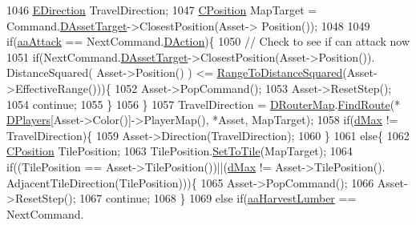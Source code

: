 \begin{DoxyCode}
{{1046                 \hyperlink{GameDataTypes_8h_acb2b033915f6659a71a38b5aa6e4eb42}{EDirection} TravelDirection;
1047                 \hyperlink{classCPosition}{CPosition} MapTarget = Command.\hyperlink{structSAssetCommand_a3d9b43f6e59c386c48c41a65448a0c39}{DAssetTarget}->ClosestPosition(Asset->
      Position());
1048                 
1049                 \textcolor{keywordflow}{if}(\hyperlink{GameDataTypes_8h_ab47668e651a3032cfb9c40ea2d60d670a948eefd20b9e43d3b4cfcf613774716d}{aaAttack} == NextCommand.\hyperlink{structSAssetCommand_a8edd3b3d59a76d5514ba403bc8076a75}{DAction})\{
1050                     \textcolor{comment}{// Check to see if can attack now}
1051                     \textcolor{keywordflow}{if}(NextCommand.\hyperlink{structSAssetCommand_a3d9b43f6e59c386c48c41a65448a0c39}{DAssetTarget}->ClosestPosition(Asset->Position()).
      DistanceSquared( Asset->Position() ) <= \hyperlink{GameModel_8cpp_afd5c111a1369dc53d1b1230506e99f7c}{RangeToDistanceSquared}(Asset->EffectiveRange()))\{
1052                         Asset->PopCommand();
1053                         Asset->ResetStep();
1054                         \textcolor{keywordflow}{continue};   
1055                     \}
1056                 \}
1057                 TravelDirection = \hyperlink{classCGameModel_a37d0b5536c88a3e6ec16f46e7a413adf}{DRouterMap}.\hyperlink{classCRouterMap_ac638dca74d6ebe3602db9f7c69881146}{FindRoute}(*
      \hyperlink{classCGameModel_a524436c3560b10e1c6d6fdd0b66565dc}{DPlayers}[Asset->Color()]->PlayerMap(), *Asset, MapTarget);
1058                 \textcolor{keywordflow}{if}(\hyperlink{GameDataTypes_8h_acb2b033915f6659a71a38b5aa6e4eb42af6546049275557ce0ade2ceee042a319}{dMax} != TravelDirection)\{
1059                     Asset->Direction(TravelDirection);
1060                 \}
1061                 \textcolor{keywordflow}{else}\{
1062                     \hyperlink{classCPosition}{CPosition} TilePosition;
1063                     TilePosition.\hyperlink{classCPosition_ae302aa21792de64c97de29e2cbbfeb94}{SetToTile}(MapTarget);
1064                     \textcolor{keywordflow}{if}((TilePosition == Asset->TilePosition())||(\hyperlink{GameDataTypes_8h_acb2b033915f6659a71a38b5aa6e4eb42af6546049275557ce0ade2ceee042a319}{dMax} != Asset->TilePosition().
      AdjacentTileDirection(TilePosition)))\{
1065                         Asset->PopCommand();
1066                         Asset->ResetStep();
1067                         \textcolor{keywordflow}{continue};    
1068                     \}
1069                     \textcolor{keywordflow}{else} \textcolor{keywordflow}{if}(\hyperlink{GameDataTypes_8h_ab47668e651a3032cfb9c40ea2d60d670a4c44c3d83b3b67a8dd2248d11bedd0ee}{aaHarvestLumber} == NextCommand.
}}
\end{DoxyCode}
